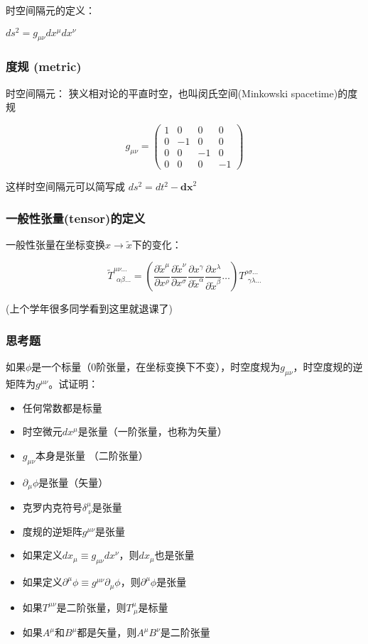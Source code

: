 \documentclass[CJK]{beamer}
\begin{document}
\begin{frame}
\bch 时空间隔元的定义：

$ds^2 = g_{\mu\nu} dx^\mu dx^\nu$

\ech
\end{frame}


\begin{frame}
\frametitle{\bch 度规 (metric) \ech}
\bch 时空间隔元：\ech
\bch 狭义相对论的平直时空，也叫闵氏空间(Minkowski spacetime)的度规 \ech

\begin{equation} 
g_{\mu\nu} =  \left( \begin{array}{rrrr} 1 & 0 & 0 & 0 \\ 0 & -1 & 0 & 0 \\ 0 & 0 & -1 & 0 \\ 0 & 0 & 0 & -1 \end{array} \right) \nonumber
\end{equation}

\bch 这样时空间隔元可以简写成 $ds^2 = dt^2 - \mathbf{dx}^2$ \ech

\end{frame}


\begin{frame}
\frametitle{\bch 一般性张量(tensor)的定义 \ech}
\bch
一般性张量在坐标变换$x \rightarrow \tilde{x}$下的变化：


$$\tilde{T}^{\mu\nu\ldots}_{\ \ \alpha\beta\ldots} = \left(\frac{\partial \tilde{x}^\mu}{\partial x^\rho}\frac{\partial \tilde{x}^\nu}{\partial x^\sigma} \frac{\partial x^\gamma }{\partial \tilde{x}^\alpha}\frac{\partial x^\lambda}{\partial \tilde{x}^\beta} \ldots \right)T^{\rho\sigma\ldots}_{\ \ \gamma\lambda\ldots} $$

\skiplines

(上个学年很多同学看到这里就退课了\bye)
\ech
\end{frame}

\begin{frame}
\frametitle{\bch 思考题 \ech}
\bch
如果$\phi$是一个标量（0阶张量，在坐标变换下不变），时空度规为$g_{\mu\nu}$，时空度规的逆矩阵为$g^{\mu\nu}$。试证明：
\begin{itemize}
\item{任何常数都是标量}
\item{时空微元$dx^\mu$是张量（一阶张量，也称为矢量）}
\item{$g_{\mu\nu}$本身是张量 （二阶张量）}
\item{$\partial_\mu\phi$是张量（矢量）}
\item{克罗内克符号$\delta^{\mu}_{\ \nu}$是张量}
\item{度规的逆矩阵$g^{\mu\nu}$是张量}
\item{如果定义$dx_{\mu} \equiv g_{\mu\nu} dx^{\nu}$，则$dx_\mu$也是张量}
\item{如果定义$\partial^\mu\phi \equiv g^{\mu\nu}\partial_\mu\phi$，则$\partial^\mu\phi$是张量}
\item{如果$T^{\mu\nu}$是二阶张量，则$T^{\mu}_{\ \mu}$是标量}
\item{如果$A^{\mu}$和$B^{\mu}$都是矢量，则$A^\mu B^\nu$是二阶张量}
\end{itemize}

\ech
\end{frame}
\end{document}
